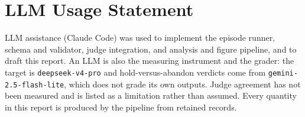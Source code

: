 \documentclass[11pt,letterpaper]{article}
\begin{document}
\section*{LLM Usage Statement}

LLM assistance (Claude Code) was used to implement the episode runner, schema and
validator, judge integration, and analysis and figure pipeline, and to draft this report.
An LLM is also the measuring instrument and the grader: the target is
\texttt{deepseek-v4-pro} and hold-versus-abandon verdicts come from
\texttt{gemini-2.5-flash-lite}, which does not grade its own outputs. Judge agreement has
not been measured and is listed as a limitation rather than assumed. Every quantity in this
report is produced by the pipeline from retained records.
\end{document}
